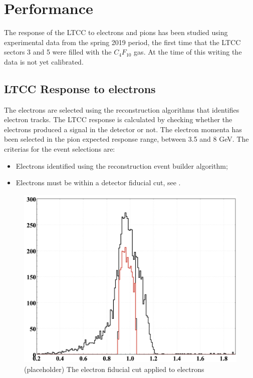 \section{Performance}

The response of the LTCC to electrons and pions has been studied using experimental data from the spring 2019 period,
the first time that the LTCC sectors 3 and 5 were filled with the $C_4F_{10}$ gas.
At the time of this writing the data is not yet calibrated.

\subsection{LTCC Response to electrons}\label{sec:elecResponse}

The electrons are selected using the reconstruction algorithms \cite{recon-nim} that identifies electron tracks.
The LTCC response is calculated by checking whether the electrons produced a signal in the detector or not.
The electron momenta has been selected in the pion expected response range, between 3.5 and 8 GeV.
The criterias for the event selections are:

\begin{itemize}
	\item  Electrons identified using the reconstruction event builder algorithm;
    \item Electrons must be within a detector fiducial cut, see .
\end{itemize}

\begin{figure}
	\centering
	\includegraphics[width=0.98\columnwidth,keepaspectratio]{img/electronDetFiducialCut.png}
	\caption{(placeholder) The electron fiducial cut applied to electrons}
	\label{fig:electronDetFiducialCut}
\end{figure}

